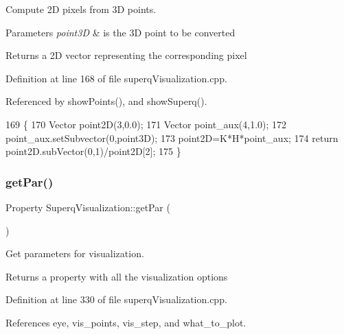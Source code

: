 Compute 2D pixels from 3D points. 


\begin{DoxyParams}{Parameters}
{\em point3D} & is the 3D point to be converted \\
\hline
\end{DoxyParams}
\begin{DoxyReturn}{Returns}
a 2D vector representing the corresponding pixel 
\end{DoxyReturn}


Definition at line 168 of file superq\+Visualization.\+cpp.



Referenced by show\+Points(), and show\+Superq().


\begin{DoxyCode}
169 \{
170     Vector point2D(3,0.0);
171     Vector point\_aux(4,1.0);
172     point\_aux.setSubvector(0,point3D);
173     point2D=K*H*point\_aux;
174     \textcolor{keywordflow}{return} point2D.subVector(0,1)/point2D[2];
175 \}
\end{DoxyCode}
\mbox{\label{classSuperqVisualization_ae4fac8f79629a3fa81a688ab4baf61f7}} 
\subsubsection{\texorpdfstring{get\+Par()}{getPar()}}
{\footnotesize\ttfamily Property Superq\+Visualization\+::get\+Par (\begin{DoxyParamCaption}{ }\end{DoxyParamCaption})}



Get parameters for visualization. 

\begin{DoxyReturn}{Returns}
a property with all the visualization options 
\end{DoxyReturn}


Definition at line 330 of file superq\+Visualization.\+cpp.



References eye, vis\+\_\+points, vis\+\_\+step, and what\+\_\+to\+\_\+plot.


